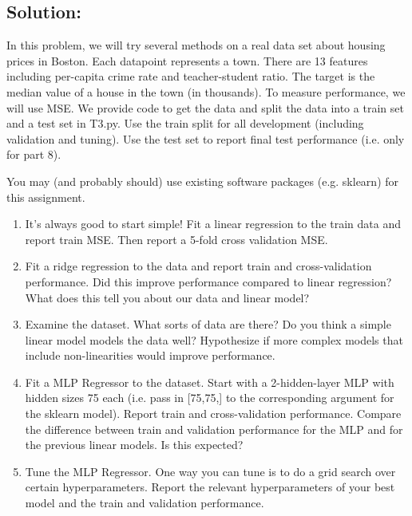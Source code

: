 \documentclass[submit]{harvardml}
\begin{document}
\subsection*{Solution:}



\newpage

\begin{problem}

  In this problem, we will try several methods on a real data set about housing prices in Boston. Each datapoint represents a town. There are 13 features including per-capita crime rate and teacher-student ratio. The target is the median value of a house in the town (in thousands). To measure performance, we will use MSE. We provide code to get the data and split the data into a train set and a test set in T3.py. Use the train split for all development (including validation and tuning). Use the test set to report final test performance (i.e. only for part 8).
  
  You may (and probably should) use existing software packages (e.g. sklearn) for this
  assignment.

\begin{enumerate}

  \item It's always good to start simple! Fit a linear regression to the train data and report train MSE. Then report a 5-fold cross validation MSE.
  
  \item Fit a ridge regression to the data and report train and cross-validation performance. Did this improve performance compared to linear regression? What does this tell you about our data and linear model?
  
  \item Examine the dataset. What sorts of data are there? Do you think a simple linear model models the data well? Hypothesize if more complex models that include non-linearities would improve performance.
    
  \item Fit a MLP Regressor to the dataset. Start with a 2-hidden-layer MLP with hidden sizes 75 each (i.e. pass in [75,75,] to the corresponding argument for the sklearn model). Report train and cross-validation performance. Compare the difference between train and validation performance for the MLP and for the previous linear models. Is this expected?
  
  \item Tune the MLP Regressor. One way you can tune is to do a grid search over certain hyperparameters. Report the relevant hyperparameters of your best model and the train and validation performance.


\end{enumerate}
\end{problem}
\end{document}
